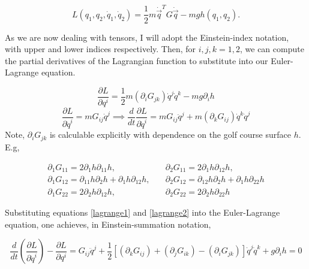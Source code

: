 \begin{equation}
	L(q_1,q_2,\dot q_1,\dot q_2) = \frac{1}{2}m\dot{\vec q}^T G \dot{\vec q}-mgh(q_1,q_2).
\end{equation}

As we are now dealing with tensors, I will adopt the Einstein-index notation, with upper and lower indices respectively. Then, for $i,j,k=1,2$, we can compute the partial derivatives of the Lagrangian function to substitute into our Euler-Lagrange equation.

\begin{equation}
	\frac{\partial L}{\partial q^i}=\frac{1}{2}m(\partial_iG_{jk})\dot q^j \dot q^k-mg\partial_i h
	\label{lagrange1}
\end{equation}
\begin{equation}
	\frac{\partial L}{\partial \dot q^i} = m G_{ij}\dot q^j \implies \frac{d}{dt}\frac{\partial L}{\partial \dot q^i} = mG_{ij}\ddot q^j + m (\partial_k G_{ij})\dot q^k \dot q^j
	\label{lagrange2}
\end{equation}
Note, $\partial_i G_{jk}$ is calculable explicitly with dependence on the golf course surface $h$. E.g,

\begin{equation}
	\begin{matrix}
		\partial_1 G_{11} = 2\partial_1 h \partial_{11}h, & \quad \partial_2G_{11}=2\partial_1 h \partial_{12}h, \\

		\partial_1 G_{12}=\partial_11 h \partial_2 h + \partial_1 h\partial_{12} h, & \quad \partial_2 G_{12} = \partial_{12}h \partial_2 h + \partial_1 h \partial_{22} h\\

		\partial_1G_{22}=2\partial_2 h \partial_{12}h, & \quad \partial_2 G_{22} = 2\partial_2 h \partial_{22} h
	\end{matrix}
\end{equation}

Substituting equations \ref{lagrange1} and \ref{lagrange2} into the Euler-Lagrange equation, one achieves, in Einstein-summation notation,

\begin{equation}
	\frac{d}{dt}\left(\frac{\partial L}{\partial \dot q^i}\right)-\frac{\partial L}{\partial q^i} = G_{ij}\ddot q^j + \frac{1}{2}\left[(\partial_k G_{ij}) + (\partial_jG_{ik})-(\partial_iG_{jk})\right]\dot q^j \dot q^k + g \partial_i h = 0
	\label{geoeq1}
\end{equation}

